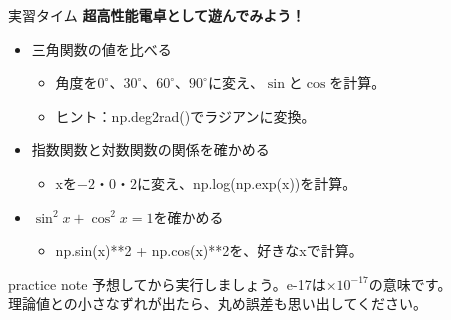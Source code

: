 \documentclass[12pt,aspectratio=43]{beamer}
\begin{document}
\begin{frame}[t]{実習タイム}
  \setlength{\parskip}{0pt}
  \textbf{超高性能電卓として遊んでみよう！}
  \par\vspace{2mm}
  \begin{itemize}
    \setlength{\itemsep}{3mm}
    \item 三角関数の値を比べる
      \begin{itemize}
        \item 角度を$0^\circ$、$30^\circ$、$60^\circ$、$90^\circ$に変え、$\sin$と$\cos$を計算。
        \item ヒント：{\codefont np.deg2rad()}でラジアンに変換。
      \end{itemize}
    \item 指数関数と対数関数の関係を確かめる
      \begin{itemize}
        \item {\codefont x}を$-2$・$0$・$2$に変え、{\codefont np.log(np.exp(x))}を計算。
      \end{itemize}
    \item $\sin^2 x+\cos^2 x=1$を確かめる
      \begin{itemize}
        \item {\codefont np.sin(x)**2 + np.cos(x)**2}を、好きな{\codefont x}で計算。
      \end{itemize}
  \end{itemize}
  \vspace{2mm}
  \begin{beamercolorbox}[wd=\textwidth,sep=1.5mm]{practice note}
    \small 予想してから実行しましょう。{\codefont e-17}は$\times10^{-17}$の意味です。\\
    理論値との小さなずれが出たら、丸め誤差も思い出してください。
  \end{beamercolorbox}
\end{frame}
\end{document}
